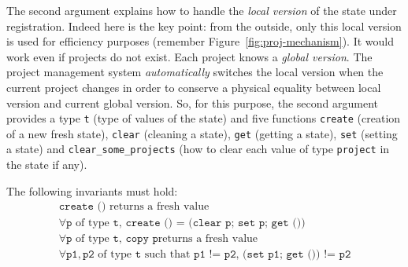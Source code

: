 The second argument explains how to handle the \emph{local
  version} of the state under
registration. Indeed here is the key point: from the outside, only this local
version is used for efficiency purposes (remember
Figure~\ref{fig:proj-mechanism}). It would work even if projects do not
exist. Each project knows a \emph{global version}. The project management system \emph{automatically}
switches the local version when the current
project changes in order to conserve a physical
equality between local version and current global
version. So, for this purpose, the second argument provides a type \texttt{t}
(type of values of the state) and five functions \texttt{create} (creation of a
new fresh state), \texttt{clear} (cleaning a state), \texttt{get} (getting a
state), \texttt{set} (setting a state) and \texttt{clear\_some\_projects} (how
to clear each value of type \texttt{project} in the state if any).

\begin{important}
The following invariants must
hold:\footnotemark
\begin{gather}
\texttt{create ()} \mbox{ returns a fresh value} \label{eq:create}\\
\forall \texttt{p} \mbox{ of type } \texttt{t},\,
\texttt{create () = (clear p; set p; get ())}\label{eq:clear}\\
\forall \texttt{p} \mbox{ of type } \texttt{t},\, \texttt{copy p} \mbox{
  returns a fresh value}
\label{eq:copy}\\
\forall \texttt{p1},\texttt{p2} \mbox{ of type } \texttt{t}
\mbox{ such that } \texttt{p1 != p2},\, \texttt{(set p1; get ()) != p2}
\label{eq:independence}
\end{gather}
\end{important}

